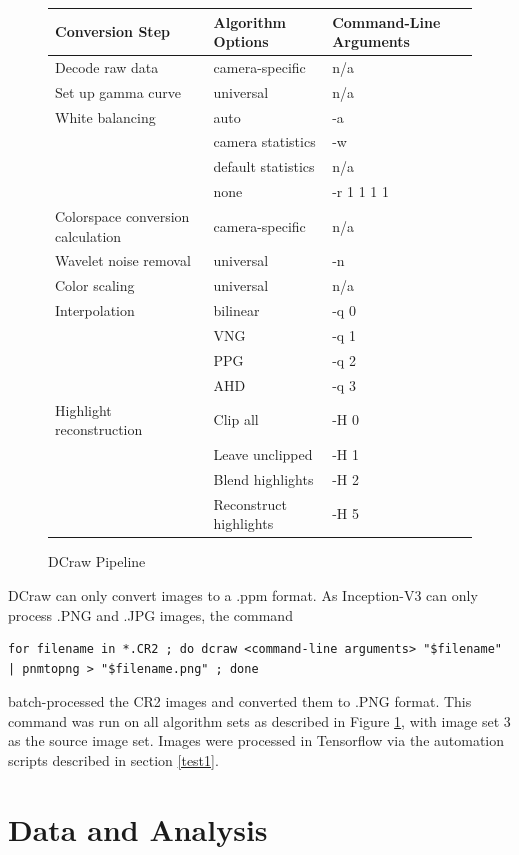 \documentclass{report}
\begin{document}
\begin{figure}[!htb]
	\begin{center}
		\label{condenseddcraw}
		\caption{DCraw Pipeline}
		\begin{tabular}{lll}
			Conversion Step & Algorithm Options & Command-Line Arguments\\
			\hline
			Decode raw data & camera-specific & n/a\\
			Set up gamma curve & universal & n/a\\
			White balancing & auto & -a\\
			& camera statistics & -w\\
			& default statistics & n/a \\
			& none & -r 1 1 1 1 \\
			Colorspace conversion calculation & camera-specific & n/a\\
			Wavelet noise removal & universal & -n \\
			Color scaling & universal & n/a \\
			Interpolation & bilinear & -q 0 \\
			& VNG & -q 1 \\
			& PPG & -q 2 \\
			& AHD & -q 3 \\
			Highlight reconstruction & Clip all & -H 0 \\
			& Leave unclipped & -H 1 \\
			& Blend highlights & -H 2 \\
			& Reconstruct highlights & -H 5 \\
		\end{tabular}
		
	\end{center}
\end{figure}

DCraw can only convert images to a .ppm format. As Inception-V3 can only process .PNG and .JPG images, the command
\footnotesize
\begin{verbatim}
for filename in *.CR2 ; do dcraw <command-line arguments> "$filename" | pnmtopng > "$filename.png" ; done
\end{verbatim}
\normalsize
batch-processed the CR2 images and converted them to .PNG format. This command was run on all algorithm sets as described in Figure \ref{condenseddcraw}, with image set 3 as the source image set. Images were processed in Tensorflow via the automation scripts described in section \ref{test1}. 

\section{Data and Analysis}
\end{document}
